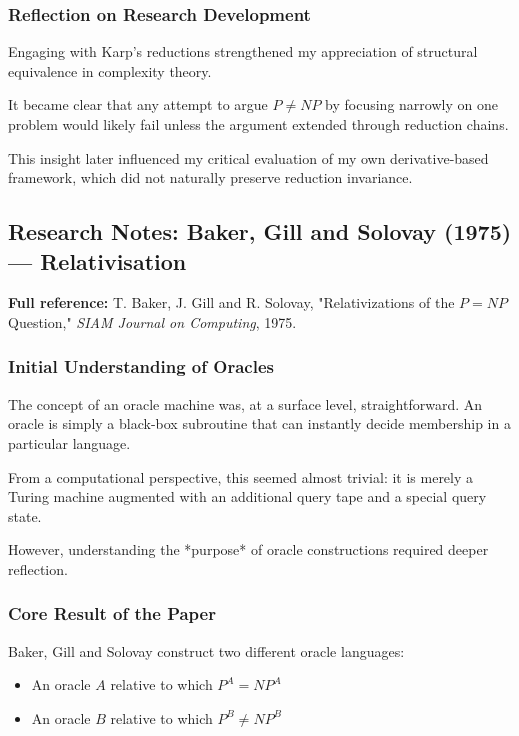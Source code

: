 \documentclass[12pt]{article}
\begin{document}
\subsubsection*{Reflection on Research Development}

Engaging with Karp's reductions strengthened my appreciation of structural equivalence in complexity theory.

It became clear that any attempt to argue $P \neq NP$ by focusing narrowly on one problem would likely fail unless the argument extended through reduction chains.

This insight later influenced my critical evaluation of my own derivative-based framework, which did not naturally preserve reduction invariance.

\subsection{Research Notes: Baker, Gill and Solovay (1975) --- Relativisation}

\textbf{Full reference:} T. Baker, J. Gill and R. Solovay, 
"Relativizations of the $P = NP$ Question," 
\textit{SIAM Journal on Computing}, 1975.

\subsubsection*{Initial Understanding of Oracles}

The concept of an oracle machine was, at a surface level, straightforward. 
An oracle is simply a black-box subroutine that can instantly decide membership in a particular language.

From a computational perspective, this seemed almost trivial: it is merely a Turing machine augmented with an additional query tape and a special query state.

However, understanding the *purpose* of oracle constructions required deeper reflection.

\subsubsection*{Core Result of the Paper}

Baker, Gill and Solovay construct two different oracle languages:

\begin{itemize}
\item An oracle $A$ relative to which $P^A = NP^A$
\item An oracle $B$ relative to which $P^B \neq NP^B$
\end{itemize}
\end{document}
